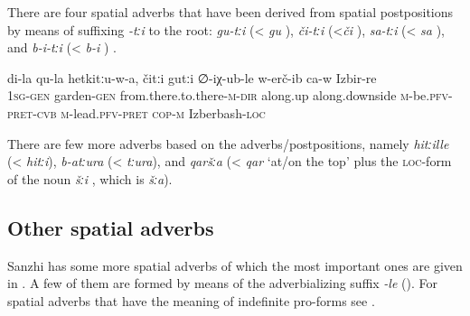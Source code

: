 There are four spatial adverbs that have been derived from spatial postpositions by means of suffixing \textit{-tːi} to the root: \textit{gu-tːi}  (< \textit{gu} ), \textit{či-tːi}  (<\textit{či} ), \textit{sa-tːi}  (< \textit{sa} ), and \textit{b-i-tːi}  (< \textit{b-i} ) .

\begin{exe}
	\ex	\label{ex:Through my garden up down they brought him to Izberbash}
	\gll	di-la	qu-la	hetkitːu-w-a,	čitːi	gutːi	∅-iχ-ub-le	w-erč-ib ca-w	Izbir-re\\
		1\textsc{sg-gen}	garden-\textsc{gen}	from.there.to.there-\textsc{m-dir}	along.up along.downside	\textsc{m}-be.\textsc{pfv-pret-cvb}	\textsc{m}-lead.\textsc{pfv}-\textsc{pret} \textsc{cop-m}	Izberbash-\textsc{loc}\\
	\glt	{}
\end{exe}

There are few more adverbs based on the adverbs/postpositions, namely \textit{hitːille}  (< \textit{hitːi}), \textit{b-atːura}  (< \textit{tːura}), and \textit{qaršːa}  (< \textit{qar} `at/on the top' plus the \textsc{loc}-form of the noun \textit{šːi} , which is \textit{šːa}).



\subsection{Other spatial adverbs}
\label{ssec:OtherSpatialAdverbs}

Sanzhi has some more spatial adverbs of which the most important ones are given in . A few of them are formed by means of the adverbializing suffix \textit{-le} (). For spatial adverbs that have the meaning of indefinite pro-forms see .

